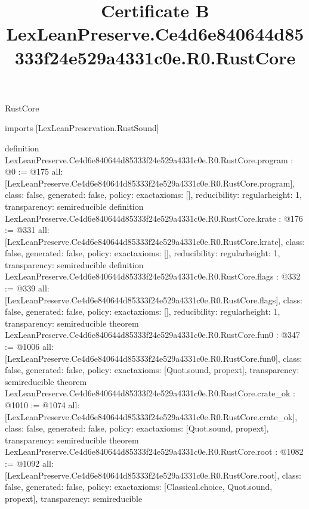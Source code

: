\begin{lexlean}{RustCore}
\title{Certificate B LexLeanPreserve.Ce4d6e840644d85333f24e529a4331c0e.R0.RustCore}
\begin{coremodule}
imports [LexLeanPreservation.RustSound]

definition LexLeanPreserve.Ce4d6e840644d85333f24e529a4331c0e.R0.RustCore.program : @0 := @175 {
  all: [LexLeanPreserve.Ce4d6e840644d85333f24e529a4331c0e.R0.RustCore.program],
  class: false,
  generated: false,
  policy: exact{axioms: []},
  reducibility: regular{height: 1},
  transparency: semireducible
}
definition LexLeanPreserve.Ce4d6e840644d85333f24e529a4331c0e.R0.RustCore.krate : @176 := @331 {
  all: [LexLeanPreserve.Ce4d6e840644d85333f24e529a4331c0e.R0.RustCore.krate],
  class: false,
  generated: false,
  policy: exact{axioms: []},
  reducibility: regular{height: 1},
  transparency: semireducible
}
definition LexLeanPreserve.Ce4d6e840644d85333f24e529a4331c0e.R0.RustCore.flags : @332 := @339 {
  all: [LexLeanPreserve.Ce4d6e840644d85333f24e529a4331c0e.R0.RustCore.flags],
  class: false,
  generated: false,
  policy: exact{axioms: []},
  reducibility: regular{height: 1},
  transparency: semireducible
}
theorem LexLeanPreserve.Ce4d6e840644d85333f24e529a4331c0e.R0.RustCore.fun0 : @347 := @1006 {
  all: [LexLeanPreserve.Ce4d6e840644d85333f24e529a4331c0e.R0.RustCore.fun0],
  class: false,
  generated: false,
  policy: exact{axioms: [Quot.sound, propext]},
  transparency: semireducible
}
theorem LexLeanPreserve.Ce4d6e840644d85333f24e529a4331c0e.R0.RustCore.crate_ok : @1010 := @1074 {
  all: [LexLeanPreserve.Ce4d6e840644d85333f24e529a4331c0e.R0.RustCore.crate_ok],
  class: false,
  generated: false,
  policy: exact{axioms: [Quot.sound, propext]},
  transparency: semireducible
}
theorem LexLeanPreserve.Ce4d6e840644d85333f24e529a4331c0e.R0.RustCore.root : @1082 := @1092 {
  all: [LexLeanPreserve.Ce4d6e840644d85333f24e529a4331c0e.R0.RustCore.root],
  class: false,
  generated: false,
  policy: exact{axioms: [Classical.choice, Quot.sound, propext]},
  transparency: semireducible
}


\end{coremodule}
\end{lexlean}

